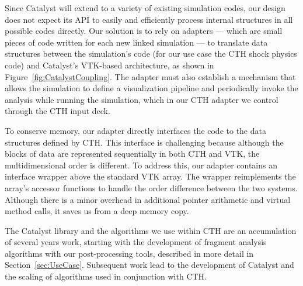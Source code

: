 Since Catalyst will extend to a variety of existing simulation codes, our
design does not expect its API to easily and efficiently process internal
structures in all possible codes directly.  Our solution is to rely on
adapters --- which are small pieces of code written for each new linked
simulation --- to translate data structures between the simulation's code
(for our use case the CTH shock physics code) and Catalyst's VTK-based
architecture, as shown in Figure~\ref{fig:CatalystCoupling}.  The adapter
must also establish a mechanism that allows the simulation to define a
visualization pipeline and periodically invoke the analysis while running
the simulation, which in our CTH adapter we control through the CTH input
deck.

To conserve memory, our adapter directly interfaces the \vda code to the
data structures defined by CTH.  This interface is challenging because
although the blocks of data are represented sequentially in both CTH and
VTK, the multidimensional order is different.  To address this, our adapter
contains an interface wrapper above the standard VTK array.  The wrapper
reimplements the array's accessor functions to handle the order difference
between the two systems.  Although there is a minor overhead in additional
pointer arithmetic and virtual method calls, it saves us from a deep memory
copy.

The Catalyst library and the algorithms we use within CTH are an
accumulation of several years work, starting with the development of
fragment analysis algorithms with our post-processing
tools, described in more
detail in Section~\ref{sec:UseCase}.  Subsequent work lead to the
development of Catalyst and the scaling of algorithms
used in conjunction with CTH.
